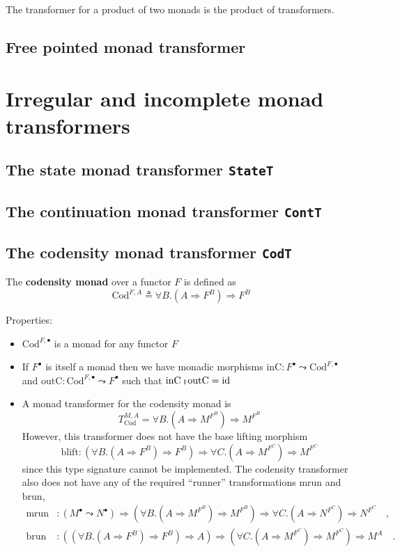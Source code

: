 The transformer for a product of two monads is the product of transformers.

\subsection{Free pointed monad transformer}

\section{Irregular and incomplete monad transformers}

\subsection{The state monad transformer \texttt{StateT}}

\subsection{The continuation monad transformer \texttt{ContT}}

\subsection{The codensity monad transformer \texttt{CodT}}

The \textbf{codensity monad} over a functor
$F$ is defined as 
\[
\text{Cod}^{F,A}\triangleq\forall B.\left(A\Rightarrow F^{B}\right)\Rightarrow F^{B}
\]

Properties:
\begin{itemize}
\item $\text{Cod}^{F,\bullet}$ is a monad for any functor $F$
\item If $F^{\bullet}$ is itself a monad then we have monadic morphisms
$\text{inC}:F^{\bullet}\leadsto\text{Cod}^{F,\bullet}$ and $\text{outC}:\text{Cod}^{F,\bullet}\leadsto F^{\bullet}$
such that $\text{inC}\,\bef\text{outC}=\text{id}$
\item A monad transformer for the codensity monad is 
\[
T_{\text{Cod}}^{M,A}=\forall B.\left(A\Rightarrow M^{F^{B}}\right)\Rightarrow M^{F^{B}}
\]
However, this transformer does not have the base lifting morphism
\[
\text{blift}:\left(\forall B.\left(A\Rightarrow F^{B}\right)\Rightarrow F^{B}\right)\Rightarrow\forall C.\left(A\Rightarrow M^{F^{C}}\right)\Rightarrow M^{F^{C}}
\]
since this type signature cannot be implemented. The codensity transformer
also does not have any of the required ``runner'' transformations
$\text{mrun}$ and $\text{brun}$,
\begin{align*}
\text{mrun} & :\left(M^{\bullet}\leadsto N^{\bullet}\right)\Rightarrow\left(\forall B.\left(A\Rightarrow M^{F^{B}}\right)\Rightarrow M^{F^{B}}\right)\Rightarrow\forall C.\left(A\Rightarrow N^{F^{C}}\right)\Rightarrow N^{F^{C}}\quad,\\
\text{brun} & :\left(\left(\forall B.\left(A\Rightarrow F^{B}\right)\Rightarrow F^{B}\right)\Rightarrow A\right)\Rightarrow\left(\forall C.\left(A\Rightarrow M^{F^{C}}\right)\Rightarrow M^{F^{C}}\right)\Rightarrow M^{A}\quad.
\end{align*}
\end{itemize}

